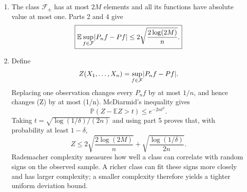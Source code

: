 \documentclass[11pt]{article}
\newcommand{\bbE}{\mathbb{E}}
\newcommand{\bbP}{\mathbb{P}}
\DeclarePairedDelimiter{\abs}{\lvert}{\rvert}
\begin{document}
\begin{enumerate}
\item The class $\mathcal F_{\pm}$ has at most $2M$ elements and all
its functions have absolute value at most one. Parts 2 and 4 give
\[
\boxed{
\bbE\sup_{f\in\mathcal F}\abs{P_nf-Pf}
\leq2\sqrt{\frac{2\log(2M)}{n}}.}
\]

\item Define
\[
Z(X_1,\ldots,X_n)=\sup_{f\in\mathcal F}\abs{P_nf-Pf}.
\]
Replacing one observation changes every $P_nf$ by at most $1/n$, and
hence changes (Z) by at most (1/n). McDiarmid's inequality gives
\[
\bbP(Z-\bbE Z>t)\leq e^{-2nt^2}.
\]
Taking $t=\sqrt{\log(1/\delta)/(2n)}$ and using part 5 proves that, with
probability at least $1-\delta$,
\[
\boxed{
Z\leq
2\sqrt{\frac{2\log(2M)}{n}}
+\sqrt{\frac{\log(1/\delta)}{2n}}.}
\]
Rademacher complexity measures how well a class can correlate with random
signs on the observed sample. A richer class can fit these signs more
closely and has larger complexity; a smaller complexity therefore yields a
tighter uniform deviation bound.
\end{enumerate}
\end{document}

